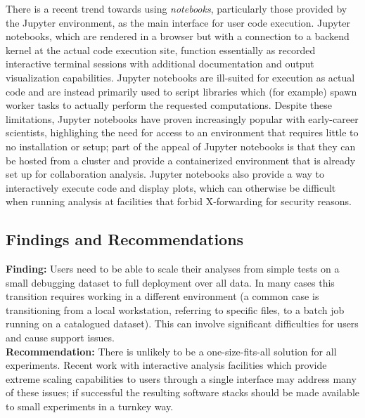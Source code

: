 There is a recent trend towards using \textit{notebooks}, particularly those provided by the Jupyter environment, as the main interface for user code execution. Jupyter notebooks, which are rendered in a browser but with a connection to a backend kernel at the actual code execution site, function essentially as recorded interactive terminal sessions with additional documentation and output visualization capabilities. Jupyter notebooks are ill-suited for execution as actual code and are instead primarily used to script libraries which (for example) spawn worker tasks to actually perform the requested computations.  Despite these limitations, Jupyter notebooks have proven increasingly popular with early-career scientists, highlighing the need for access to an environment that requires little to no installation or setup; part of the appeal of Jupyter notebooks is that they can be hosted from a cluster and provide a containerized environment that is already set up for collaboration analysis.  Jupyter notebooks also provide a way to interactively execute code and display plots, which can otherwise be difficult when running analysis at facilities that forbid X-forwarding for security reasons.

\subsection{Findings and Recommendations}
\textbf{Finding:} Users need to be able to scale their analyses from simple tests on a small debugging dataset to full deployment over all data. In many cases this transition requires working in a different environment (a common case is transitioning from a local workstation, referring to specific files, to a batch job running on a catalogued dataset). This can involve significant difficulties for users and cause support issues.\\
\textbf{Recommendation:} There is unlikely to be a one-size-fits-all solution for all experiments. Recent work with interactive analysis facilities which provide extreme scaling capabilities to users through a single interface may address many of these issues; if successful the resulting software stacks should be made available to small experiments in a turnkey way.\\



